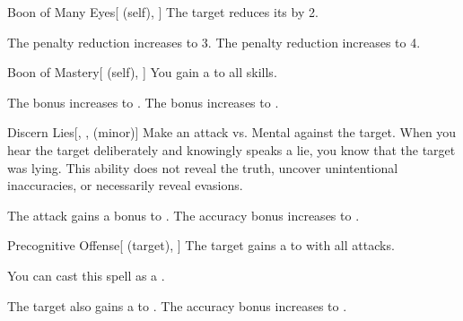 \lowercase{\hypertarget{spell:Boon of Many Eyes}{}}\label{spell:Boon of Many Eyes}
\begin{attuneability}[Rank 3]{\hypertarget{spell:Boon of Many Eyes}{Boon of Many Eyes}}[ (self), ]
The target reduces its  by 2.

\rankline
{} The penalty reduction increases to 3.
 The penalty reduction increases to 4.
\end{attuneability}
\vspace{0.25em}



\lowercase{\hypertarget{spell:Boon of Mastery}{}}\label{spell:Boon of Mastery}
\begin{attuneability}[Rank 3]{\hypertarget{spell:Boon of Mastery}{Boon of Mastery}}[ (self), ]
You gain a   to all skills.

\rankline
{} The bonus increases to .
 The bonus increases to .
\end{attuneability}
\vspace{0.25em}



\lowercase{\hypertarget{spell:Discern Lies}{}}\label{spell:Discern Lies}
\begin{freeability}[Rank 3]{\hypertarget{spell:Discern Lies}{Discern Lies}}[, ,  (minor)]
Make an attack vs. Mental against the target.
\hit When you hear the target deliberately and knowingly speaks a lie, you know that the target was lying.
This ability does not reveal the truth, uncover unintentional inaccuracies, or necessarily reveal evasions.

\rankline
{} The attack gains a  bonus to .
 The accuracy bonus increases to .
\end{freeability}
\vspace{0.25em}



\lowercase{\hypertarget{spell:Precognitive Offense}{}}\label{spell:Precognitive Offense}
\begin{attuneability}[Rank 3]{\hypertarget{spell:Precognitive Offense}{Precognitive Offense}}[ (target), ]
The target gains a   to  with all attacks.

You can cast this spell as a .

\rankline
{} The target also gains a   to .
 The accuracy bonus increases to .
\end{attuneability}
\vspace{0.25em}



